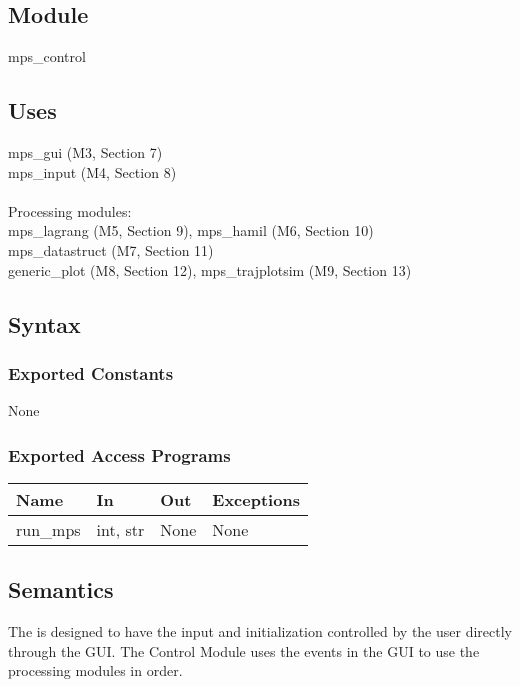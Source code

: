 \documentclass[12pt, titlepage]{article}
\begin{document}
\subsection{Module}

mps\_control

\subsection{Uses}

mps\_gui (M3, Section 7)\\
mps\_input (M4, Section 8)\\\\
Processing modules: \\
mps\_lagrang (M5, Section 9), mps\_hamil (M6, Section 10)\\
mps\_datastruct (M7, Section 11)\\
generic\_plot (M8, Section 12), mps\_trajplotsim (M9, Section 13) 

\subsection{Syntax}

\subsubsection{Exported Constants}

None

\subsubsection{Exported Access Programs}

\begin{center}
\begin{tabular}{p{2cm} p{4cm} p{4cm} p{2cm}}
\hline
\textbf{Name} & \textbf{In} & \textbf{Out} & \textbf{Exceptions} \\
\hline
run\_mps & int, str & None & None \\
\hline
\end{tabular}
\end{center}

\subsection{Semantics}

The \progname is designed to have the input and initialization controlled by 
the user directly through the GUI.
The \progname Control Module uses the events in the \progname GUI to use the 
processing modules in order.
\end{document}
